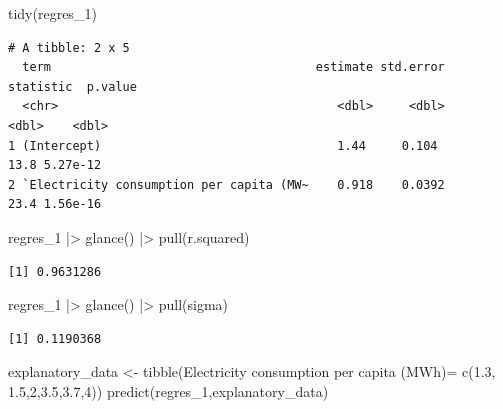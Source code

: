 \documentclass[
  letterpaper,
  DIV=11,
  numbers=noendperiod]{scrartcl}
\newenvironment{Shaded}{\begin{snugshade}}{\end{snugshade}}
\newcommand{\AttributeTok}[1]{\textcolor[rgb]{0.40,0.45,0.13}{#1}}
\newcommand{\DecValTok}[1]{\textcolor[rgb]{0.68,0.00,0.00}{#1}}
\newcommand{\FloatTok}[1]{\textcolor[rgb]{0.68,0.00,0.00}{#1}}
\newcommand{\FunctionTok}[1]{\textcolor[rgb]{0.28,0.35,0.67}{#1}}
\newcommand{\NormalTok}[1]{\textcolor[rgb]{0.00,0.23,0.31}{#1}}
\newcommand{\OtherTok}[1]{\textcolor[rgb]{0.00,0.23,0.31}{#1}}
\newcommand{\SpecialCharTok}[1]{\textcolor[rgb]{0.37,0.37,0.37}{#1}}
\newcommand{\StringTok}[1]{\textcolor[rgb]{0.13,0.47,0.30}{#1}}
\begin{document}
\begin{Shaded}
\begin{Highlighting}[]
\FunctionTok{tidy}\NormalTok{(regres\_1)}
\end{Highlighting}
\end{Shaded}

\begin{verbatim}
# A tibble: 2 x 5
  term                                     estimate std.error statistic  p.value
  <chr>                                       <dbl>     <dbl>     <dbl>    <dbl>
1 (Intercept)                                 1.44     0.104       13.8 5.27e-12
2 `Electricity consumption per capita (MW~    0.918    0.0392      23.4 1.56e-16
\end{verbatim}

\begin{Shaded}
\begin{Highlighting}[]
\NormalTok{regres\_1 }\SpecialCharTok{|\textgreater{}} \FunctionTok{glance}\NormalTok{() }\SpecialCharTok{|\textgreater{}} \FunctionTok{pull}\NormalTok{(r.squared)}
\end{Highlighting}
\end{Shaded}

\begin{verbatim}
[1] 0.9631286
\end{verbatim}

\begin{Shaded}
\begin{Highlighting}[]
\NormalTok{regres\_1 }\SpecialCharTok{|\textgreater{}} \FunctionTok{glance}\NormalTok{() }\SpecialCharTok{|\textgreater{}} \FunctionTok{pull}\NormalTok{(sigma)}
\end{Highlighting}
\end{Shaded}

\begin{verbatim}
[1] 0.1190368
\end{verbatim}

\begin{Shaded}
\begin{Highlighting}[]
\NormalTok{explanatory\_data }\OtherTok{\textless{}{-}} \FunctionTok{tibble}\NormalTok{(}\StringTok{\textasciigrave{}}\AttributeTok{Electricity consumption per capita (MWh)}\StringTok{\textasciigrave{}}\OtherTok{=} \FunctionTok{c}\NormalTok{(}\FloatTok{1.3}\NormalTok{, }\FloatTok{1.5}\NormalTok{,}\DecValTok{2}\NormalTok{,}\FloatTok{3.5}\NormalTok{,}\FloatTok{3.7}\NormalTok{,}\DecValTok{4}\NormalTok{))}
\FunctionTok{predict}\NormalTok{(regres\_1,explanatory\_data)}
\end{Highlighting}
\end{Shaded}
\end{document}
